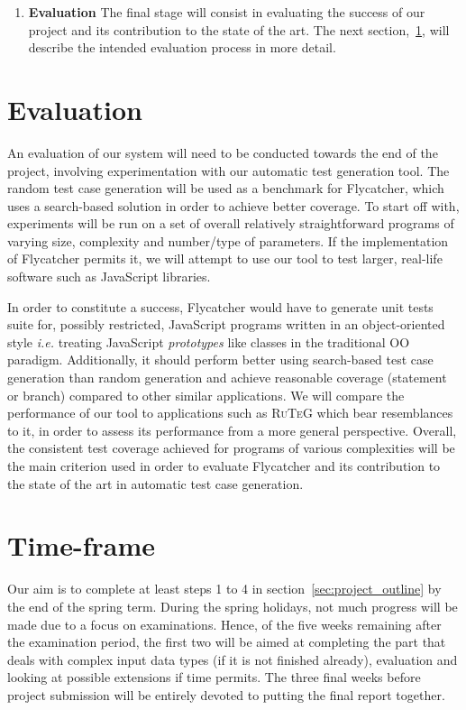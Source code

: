\documentclass[a4paper,11pt,titlepage]{report}
\begin{document}
\begin{enumerate}
	\item{\textbf{Evaluation}}
	The final stage will consist in evaluating the success of our project and its contribution to the state of the art. The next section,~\ref{sec:evaluation}, will describe the intended evaluation process in more detail.

\end{enumerate}

\section{Evaluation}
\label{sec:evaluation}
An evaluation of our system will need to be conducted towards the end of the project, involving experimentation with our automatic test generation tool. The random test case generation will be used as a benchmark for \textsf{Flycatcher}, which uses a search-based solution in order to achieve better coverage. To start off with, experiments will be run on a set of overall relatively straightforward programs of varying size, complexity and number/type of parameters. If the implementation of \textsf{Flycatcher} permits it, we will attempt to use our tool to test larger, real-life software such as JavaScript libraries.

In order to constitute a success, \textsf{Flycatcher} would have to generate unit tests suite for, possibly restricted, JavaScript programs written in an object-oriented style \emph{i.e.} treating JavaScript \emph{prototypes} like classes in the traditional OO paradigm. Additionally, it should perform better using search-based test case generation than random generation and achieve reasonable coverage (statement or branch) compared to other similar applications. We will compare the performance of our tool to applications such as \textsc{RuTeG} which bear resemblances to it, in order to assess its performance from a more general perspective. Overall, the consistent test coverage achieved for programs of various complexities will be the main criterion used in order to evaluate \textsf{Flycatcher} and its contribution to the state of the art in automatic test case generation.

\section{Time-frame}
Our aim is to complete at least steps 1 to 4 in section~\ref{sec:project_outline} by the end of the spring term. During the spring holidays, not much progress will be made due to a focus on examinations. Hence, of the five weeks remaining after the examination period, the first two will be aimed at completing the part that deals with complex input data types (if it is not finished already), evaluation and looking at possible extensions if time permits. The three final weeks before project submission will be entirely devoted to putting the final report together.



\end{document}
